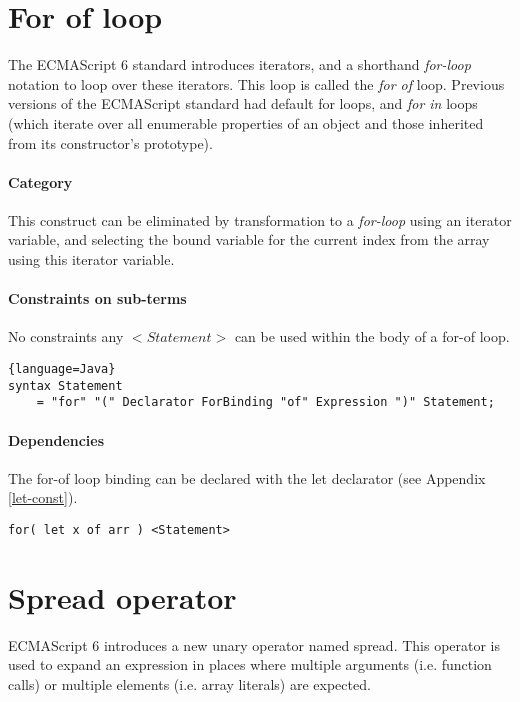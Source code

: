 \section{For of loop}
The ECMAScript 6 standard introduces iterators, and a shorthand \textit{for-loop} notation to loop over these iterators. This loop is called the \textit{for of} loop\cite[13.6.4]{SpecJS}. Previous versions of the ECMAScript standard had default for loops, and \textit{for in} loops (which iterate over all enumerable properties of an object and those inherited from its constructor's prototype).

\paragraph{Category}
This construct can be eliminated by transformation to a \textit{for-loop} using an iterator variable, and selecting the bound variable for the current index from the array using this iterator variable.

\paragraph{Constraints on sub-terms}
No constraints any $<Statement>$ can be used within the body of a for-of loop.

\begin{lstlisting}{language=Java}
syntax Statement 
	= "for" "(" Declarator ForBinding "of" Expression ")" Statement;
\end{lstlisting}
    
\paragraph{Dependencies}
The for-of loop binding can be declared with the let declarator (see Appendix \ref{let-const}).

\begin{lstlisting}
for( let x of arr ) <Statement>
\end{lstlisting}


\section{Spread operator}
ECMAScript 6 introduces a new unary operator named spread\cite[12.3.6.1]{SpecJS}. This operator is used to expand an expression in places where multiple arguments (i.e. function calls) or multiple elements (i.e. array literals) are expected.

